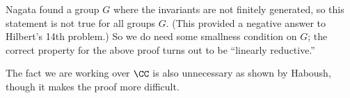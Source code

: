 \documentclass[../notes.tex]{subfiles}
\begin{document}
\begin{remark}
	Nagata found a group $G$ where the invariants are not finitely generated, so this statement is not true for all groups $G.$ (This provided a negative answer to Hilbert's 14th problem.) So we do need some smallness condition on $G$; the correct property for the above proof turns out to be ``linearly reductive.''
\end{remark}
\begin{remark}
	The fact we are working over $\CC$ is also unnecessary as shown by Haboush, though it makes the proof more difficult.
\end{remark}
\end{document}
